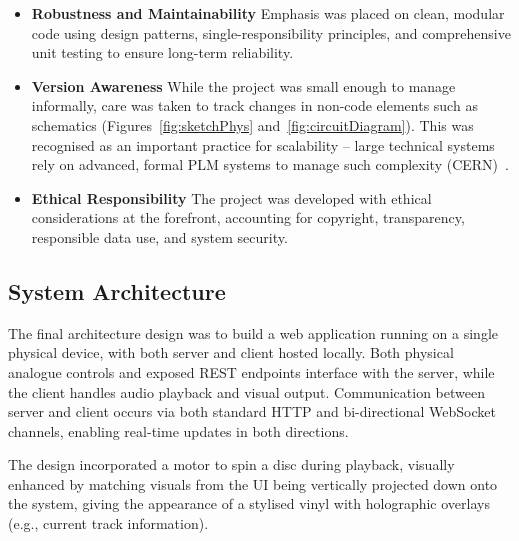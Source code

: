             \begin{itemize}
                \item \textbf{Robustness and Maintainability} Emphasis was placed on clean, modular code using design patterns, single-responsibility principles, and comprehensive unit testing to ensure long-term reliability.
            \end{itemize}
    
            \begin{itemize}
                \item \textbf{Version Awareness} While the project was small enough to manage informally, care was taken to track changes in non-code elements such as schematics (Figures~\ref{fig:sketchPhys} and~\ref{fig:circuitDiagram}). This was recognised as an important practice for scalability -- large technical systems rely on advanced, formal PLM systems to manage such complexity (CERN)~\cite{friman2023plm}.
            \end{itemize}
    
            \begin{itemize}
                \item \textbf{Ethical Responsibility} The project was developed with ethical considerations at the forefront, accounting for copyright, transparency, responsible data use, and system security.
            \end{itemize}
        
        \subsection{System Architecture} %
    
            The final architecture design was to build a web application running on a single physical device, with both server and client hosted locally. Both physical analogue controls and exposed REST endpoints interface with the server, while the client handles audio playback and visual output. Communication between server and client occurs via both standard HTTP and bi-directional WebSocket channels, enabling real-time updates in both directions.
    
            The design incorporated a motor to spin a disc during playback, visually enhanced by matching visuals from the UI being vertically projected down onto the system, giving the appearance of a stylised vinyl with holographic overlays (e.g., current track information).
    
